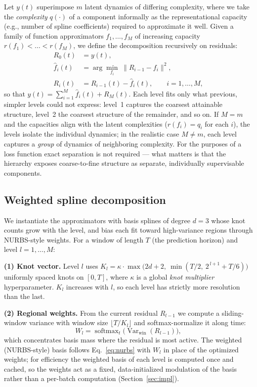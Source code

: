 \documentclass[11pt,twocolumn]{article}
\begin{document}
Let $y(t)$ superimpose $m$ latent dynamics of differing complexity, where we take the \emph{complexity} $q(\cdot)$ of a component informally as the representational capacity (e.g., number of spline coefficients) required to approximate it well. Given a family of function approximators $f_1, \dots, f_M$ of increasing capacity $r(f_1) < \dots < r(f_M)$, we define the decomposition recursively on residuals:
\begin{align}
R_0(t) &= y(t), \\
\hat{f}_i(t) &= \arg\min_{f_i} \; \lVert R_{i-1} - f_i \rVert^2, \\
R_i(t) &= R_{i-1}(t) - \hat{f}_i(t), \qquad i = 1,\dots,M,
\end{align}
so that $y(t) = \sum_{i=1}^{M} \hat{f}_i(t) + R_M(t)$. Each level fits only what previous, simpler levels could not express: level~1 captures the coarsest attainable structure, level~2 the coarsest structure of the remainder, and so on. If $M = m$ and the capacities align with the latent complexities ($r(f_i) = q_i$ for each $i$), the levels isolate the individual dynamics; in the realistic case $M \neq m$, each level captures a \emph{group} of dynamics of neighboring complexity. For the purposes of a loss function exact separation is not required --- what matters is that the hierarchy exposes coarse-to-fine structure as separate, individually supervisable components.

\subsection{Weighted spline decomposition}
\label{sec:wsd}

We instantiate the approximators with basis splines of degree $d=3$ whose knot counts grow with the level, and bias each fit toward high-variance regions through NURBS-style weights. For a window of length $T$ (the prediction horizon) and level $l = 1, \dots, M$:

\textbf{(1) Knot vector.} Level $l$ uses $K_l = \kappa \cdot \max\!\big(2d + 2,\ \min(T/2,\ 2^{\,l+1} + T/6)\big)$ uniformly spaced knots on $[0, T]$, where $\kappa$ is a global \emph{knot multiplier} hyperparameter. $K_l$ increases with $l$, so each level has strictly more resolution than the last.

\textbf{(2) Regional weights.} From the current residual $R_{l-1}$ we compute a sliding-window variance with window size $\lfloor T / K_l \rfloor$ and softmax-normalize it along time:
\begin{equation}
W_l = \operatorname{softmax}_t \big( \operatorname{Var}_{\mathrm{win}}(R_{l-1}) \big),
\end{equation}
which concentrates basis mass where the residual is most active. The weighted (NURBS-style) basis follows Eq.~\eqref{eq:nurbs} with $W_l$ in place of the optimized weights; for efficiency the weighted basis of each level is computed once and cached, so the weights act as a fixed, data-initialized modulation of the basis rather than a per-batch computation (Section~\ref{sec:impl}).
\end{document}
